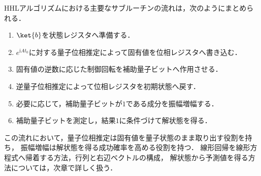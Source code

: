 HHLアルゴリズムにおける主要なサブルーチンの流れは，次のようにまとめられる．

\begin{enumerate}[(1)]
  \item $\ket{b}$を状態レジスタへ準備する．
  \item $e^{\mathrm{i}At_0}$に対する量子位相推定によって固有値を位相レジスタへ書き込む．
  \item 固有値の逆数に応じた制御回転を補助量子ビットへ作用させる．
  \item 逆量子位相推定によって位相レジスタを初期状態へ戻す．
  \item 必要に応じて，補助量子ビットが$1$である成分を振幅増幅する．
  \item 補助量子ビットを測定し，結果$1$に条件づけて解状態を得る．
\end{enumerate}

この流れにおいて，量子位相推定は固有値を量子状態のまま取り出す役割を持ち，
振幅増幅は解状態を得る成功確率を高める役割を持つ．
線形回帰を線形方程式へ帰着する方法，行列と右辺ベクトルの構成，
解状態から予測値を得る方法については，次章で詳しく扱う．
